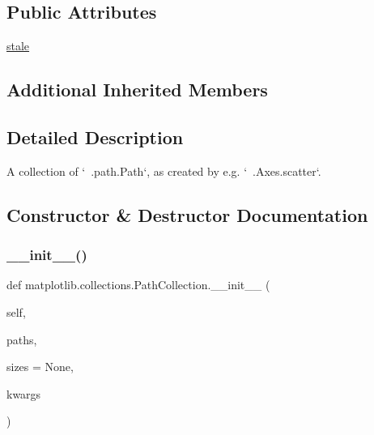 \subsection*{Public Attributes}
\begin{DoxyCompactItemize}
\item 
\hyperlink{classmatplotlib_1_1collections_1_1PathCollection_a9758fa19ca05690f0bee6b167bf094db}{stale}
\end{DoxyCompactItemize}
\subsection*{Additional Inherited Members}


\subsection{Detailed Description}
\begin{DoxyVerb}A collection of `~.path.Path`\s, as created by e.g. `~.Axes.scatter`.
\end{DoxyVerb}
 

\subsection{Constructor \& Destructor Documentation}
\mbox{\label{classmatplotlib_1_1collections_1_1PathCollection_a494f67a1ee1481a8ece37908357e79c7}} 
\subsubsection{\texorpdfstring{\+\_\+\+\_\+init\+\_\+\+\_\+()}{\_\_init\_\_()}}
{\footnotesize\ttfamily def matplotlib.\+collections.\+Path\+Collection.\+\_\+\+\_\+init\+\_\+\+\_\+ (\begin{DoxyParamCaption}\item[{}]{self,  }\item[{}]{paths,  }\item[{}]{sizes = {\ttfamily None},  }\item[{}]{kwargs }\end{DoxyParamCaption})}

